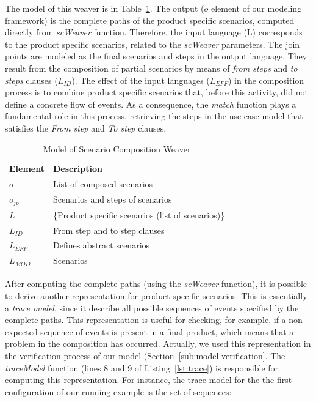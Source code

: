 The model of this weaver is in Table~\ref{tab:sc-weaver}. The output ($o$ element of our modeling framework) is the complete paths of the product specific scenarios, computed directly from \emph{scWeaver} function. Therefore, the input language (L) corresponds to the product specific scenarios, related to the \emph{scWeaver}
 parameters.
The join points are modeled as the final scenarios and steps in the output language. They result from the composition of partial scenarios by means of
\emph{from steps} and \emph{to steps} clauses ($L_{ID}$).
The effect of the input languages ($L_{EFF}$) in the composition process is to combine
product specific scenarios that, before this activity, did not define a concrete flow of events. As a consequence, the \emph{match} function
plays a fundamental role in this process, retrieving the steps in the use case model that satisfies the \emph{From step} and \emph{To step} clauses.

\begin{table}[hbt]
\begin{center}
\caption{Model of Scenario Composition Weaver} \label{tab:sc-weaver}
\begin{tabular}{p{0.4in}p{2.6in}}
   \hline\noalign{\smallskip}
  {\bf Element} & {\bf Description} \\
   \noalign{\smallskip}
   \hline
   \noalign{\smallskip}
   $o$               & List of composed scenarios  \\
   $o_{jp}$        & Scenarios and steps of scenarios \\
   $L$               & \{Product specific scenarios (list of scenarios)\} \\
   $L_{ID}$       & From step and to step clauses \\
   $L_{EFF}$    & Defines abstract scenarios  \\
   $L_{MOD}$  &  Scenarios \\
  \hline
  \end{tabular}
\end{center}
\end{table}


After computing the complete paths (using the \emph{scWeaver} function), it is possible to derive another representation for product specific scenarios. This is essentially a \emph{trace model}, since it describe all possible sequences of events specified by the complete paths. This representation is useful for checking, for example, if a non-expected sequence of events is present in a final product, which means that a problem in the composition has occurred. Actually, we used this representation in the verification process of our model (Section~\ref{sub:model-verification}. The \emph{traceModel} function (lines 8 and 9 of Listing~\ref{lst:trace}) is responsible for computing this representation. For instance, the trace model for the the first configuration of our running example is the set of sequences:


